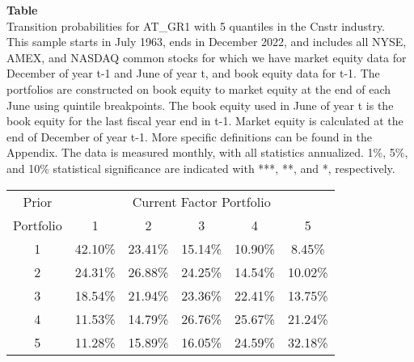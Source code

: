 \begin{table*}[ht!]
\raggedright
{}
\label{tab: transition_probs_AT_GR1_Cnstr_with_5_quantiles}
\textbf{Table \thetable} \\
Transition probabilities for AT_GR1 with 5 quantiles in the Cnstr industry. \\
\hspace*{1em}This sample starts in July 1963, ends in December 2022, and includes all NYSE, AMEX, and NASDAQ common stocks for which we have market equity data for December of year t-1 and June of year t, and book equity data for t-1. The portfolios are constructed on book equity to market equity at the end of each June using quintile breakpoints.  The book equity used in June of year t is the book equity for the last fiscal year end in t-1.  Market equity is calculated at the end of December of year t-1.  More specific definitions can be found in the Appendix.  The data is measured monthly, with all statistics annualized.  1\%, 5\%, and 10\% statistical significance are indicated with ***, **, and *, respectively. \\
\vspace{0.5em}
\centering
\begin{adjustbox}{max width=\textwidth}
\begin{tabular}{@{}cccccc@{}}
\toprule
Prior & \multicolumn{5}{c}{Current Factor Portfolio} \\
Portfolio & 1 & 2 & 3 & 4 & 5 \\
\midrule
1 & 42.10\% & 23.41\% & 15.14\% & 10.90\% & 8.45\% \\
2 & 24.31\% & 26.88\% & 24.25\% & 14.54\% & 10.02\% \\
3 & 18.54\% & 21.94\% & 23.36\% & 22.41\% & 13.75\% \\
4 & 11.53\% & 14.79\% & 26.76\% & 25.67\% & 21.24\% \\
5 & 11.28\% & 15.89\% & 16.05\% & 24.59\% & 32.18\% \\
\bottomrule
\end{tabular}
\end{adjustbox}
\end{table*}